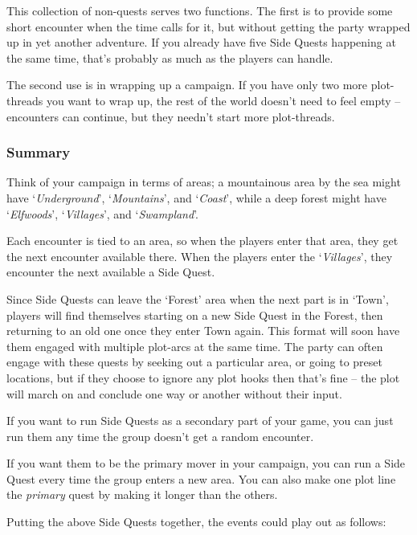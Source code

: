 \begin{multicols}{2}
\begin{list}{\sqn}{}
\end{list}

This collection of non-quests serves two functions.
The first is to provide some short encounter when the time calls for it, but without getting the party wrapped up in yet another \gls{adventure}.
If you already have five Side Quests happening at the same time, that's probably as much as the players can handle.

The second use is in wrapping up a campaign.
If you have only two more plot-threads you want to wrap up, the rest of the world doesn't need to feel empty -- encounters can continue, but they needn't start more plot-threads.

\subsubsection{Summary}

Think of your campaign in terms of areas; a mountainous area by the sea might have `\emph{Underground}', `\emph{Mountains}', and `\emph{Coast}', while a deep forest might have `\emph{Elfwoods}', `\emph{Villages}', and `\emph{Swampland}'.

Each encounter is tied to an area, so when the players enter that area, they get the next encounter available there.
When the players enter the `\emph{Villages}', they encounter the next available a Side Quest.

Since Side Quests can leave the `Forest' area when the next part is in `Town', players will find themselves starting on a new Side Quest in the Forest, then returning to an old one once they enter Town again.
This format will soon have them engaged with multiple plot-arcs at the same time.
The party can often engage with these quests by seeking out a particular area, or going to preset locations, but if they choose to ignore any plot hooks then that's fine -- the plot will march on and conclude one way or another without their input.

If you want to run Side Quests as a secondary part of your game, you can just run them any time the group doesn't get a random encounter.

If you want them to be the primary mover in your campaign, you can run a Side Quest every time the group enters a new area.
You can also make one plot line the \emph{primary} quest by making it longer than the others.

Putting the above Side Quests together, the events could play out as follows:


\end{multicols}
